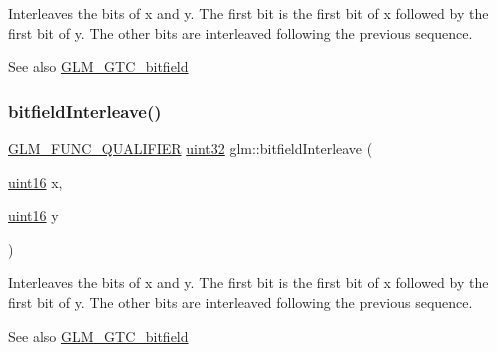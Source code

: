 Interleaves the bits of x and y. The first bit is the first bit of x followed by the first bit of y. The other bits are interleaved following the previous sequence.

\begin{DoxySeeAlso}{See also}
\mbox{\hyperlink{group__gtc__bitfield}{G\+L\+M\+\_\+\+G\+T\+C\+\_\+bitfield}} 
\end{DoxySeeAlso}
\mbox{\label{group__gtc__bitfield_ga19ef8360379483e3ee245e89cb62ff93}} 
\subsubsection{\texorpdfstring{bitfield\+Interleave()}{bitfieldInterleave()}\hspace{0.1cm}{\footnotesize\ttfamily [4/16]}}
{\footnotesize\ttfamily \mbox{\hyperlink{setup_8hpp_a33fdea6f91c5f834105f7415e2a64407}{G\+L\+M\+\_\+\+F\+U\+N\+C\+\_\+\+Q\+U\+A\+L\+I\+F\+I\+ER}} \mbox{\hyperlink{group__gtc__type__precision_ga202b6a53c105fcb7e531f9b443518451}{uint32}} glm\+::bitfield\+Interleave (\begin{DoxyParamCaption}\item[{\mbox{\hyperlink{group__gtc__type__precision_gad8c2939e1fdd8e5828b31d95c52255d5}{uint16}}}]{x,  }\item[{\mbox{\hyperlink{group__gtc__type__precision_gad8c2939e1fdd8e5828b31d95c52255d5}{uint16}}}]{y }\end{DoxyParamCaption})}

Interleaves the bits of x and y. The first bit is the first bit of x followed by the first bit of y. The other bits are interleaved following the previous sequence.

\begin{DoxySeeAlso}{See also}
\mbox{\hyperlink{group__gtc__bitfield}{G\+L\+M\+\_\+\+G\+T\+C\+\_\+bitfield}} 
\end{DoxySeeAlso}
\mbox{\label{group__gtc__bitfield_ga0de51d5985e6a703f305a5a61479babd}} 
